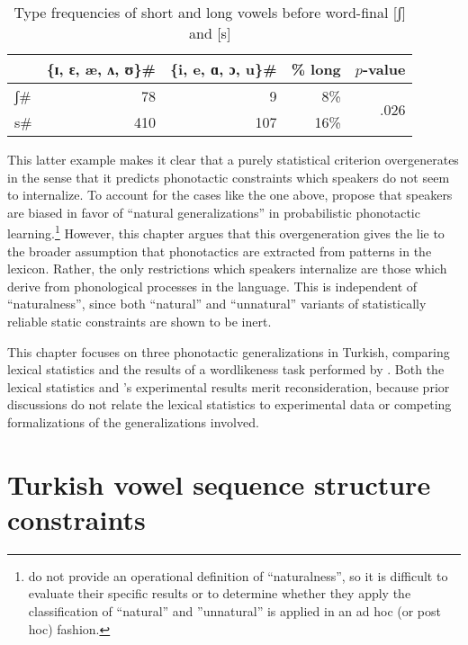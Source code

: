 \begin{table}[t]
\centering
\begin{tabular}{l r r r r}
\toprule
          & \{ɪ, ɛ, æ, ʌ, ʊ\}\gap{}\# & \{i, e, ɑ, ɔ, u\}\gap{}\# & \% long & $p$-value \\
\midrule
\gap{}ʃ\# & 78                & 9                 & 8\%      & \multirow{2}{*}{.026} \\
\gap{}s\# & 410               & 107               & 16\%     & \\
\bottomrule
\end{tabular}
\caption{Type frequencies of short and long vowels before word-final [ʃ] and [s]}
\label{ssh}
\end{table}

This latter example makes it clear that a purely statistical criterion overgenerates in the sense that it predicts phonotactic constraints which speakers do not seem to internalize.
To account for the cases like the one above, \citet{HayesInPress} propose that speakers are biased in favor of ``natural generalizations'' in probabilistic phonotactic learning.\footnote{
    \citeauthor{HayesInPress} do not provide an operational definition of ``naturalness'', so it is difficult to evaluate their specific results or to determine whether they apply the classification of ``natural'' and ''unnatural'' is applied in an ad hoc (or post hoc) fashion.}
However, this chapter argues that this overgeneration gives the lie to the broader assumption that phonotactics are extracted from patterns in the lexicon.
Rather, the only restrictions which speakers internalize are those which derive from phonological processes in the language.
This is independent of ``naturalness'', since both ``natural'' and ``unnatural'' variants of statistically reliable static constraints are shown to be inert.

This chapter focuses on three phonotactic generalizations in Turkish, comparing lexical statistics and the results of a wordlikeness task performed by \citet{Zimmer1969}.
Both the lexical statistics and \citeauthor{Zimmer1969}'s experimental results merit reconsideration, because prior discussions do not relate the lexical statistics to experimental data or competing formalizations of the generalizations involved.

\section{Turkish vowel sequence structure constraints}

